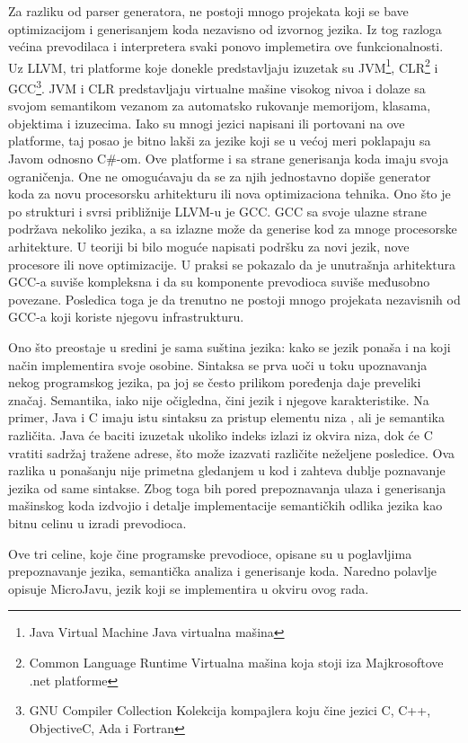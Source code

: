 Za razliku od parser generatora, ne postoji mnogo projekata koji se bave optimizacijom i generisanjem koda nezavisno od izvornog jezika.
Iz tog razloga većina prevodilaca i interpretera svaki ponovo implemetira ove funkcionalnosti. 
Uz LLVM, tri platforme koje donekle predstavljaju izuzetak su 
JVM\footnote{\skr \eng Java Virtual Machine \ndash Java virtualna mašina}, 
CLR\footnote{\skr \eng Common Language Runtime \ndash Virtualna mašina koja stoji iza Majkrosoftove .net platforme} 
i GCC\footnote{\skr \eng GNU Compiler Collection \ndash Kolekcija kompajlera koju čine jezici C, C++, ObjectiveC, Ada i Fortran}. 
JVM i CLR predstavljaju virtualne mašine visokog nivoa i dolaze sa svojom semantikom vezanom za automatsko rukovanje memorijom, klasama, objektima i izuzecima. 
Iako su mnogi jezici napisani ili portovani na ove platforme, taj posao je bitno lakši za jezike koji se u većoj meri poklapaju sa Javom odnosno C\#-om. 
Ove platforme i sa strane generisanja koda imaju svoja ograničenja.
One ne omogućavaju da se za njih jednostavno dopiše generator koda za novu procesorsku arhitekturu ili nova optimizaciona tehnika. 
Ono što je po strukturi i svrsi približnije LLVM-u je GCC.
GCC sa svoje ulazne strane podržava nekoliko jezika, a sa izlazne može da generise kod za mnoge procesorske arhitekture.
U teoriji bi bilo moguće napisati podršku za novi jezik, nove procesore ili nove optimizacije.
U praksi se pokazalo da je unutrašnja arhitektura GCC-a suviše kompleksna i da su komponente prevodioca suviše međusobno povezane. 
Posledica toga je da trenutno ne postoji mnogo projekata nezavisnih od GCC-a koji koriste njegovu infrastrukturu.

Ono što preostaje u sredini je sama suština jezika: kako se jezik ponaša i na koji način implementira svoje osobine.
Sintaksa se prva uoči u toku upoznavanja nekog programskog jezika, pa joj se često prilikom poređenja daje preveliki značaj.
Semantika, iako nije očigledna, čini jezik i njegove karakteristike.
Na primer, Java i C imaju istu sintaksu za pristup elementu niza \ndash {}, ali je semantika različita.
Java će baciti izuzetak ukoliko indeks izlazi iz okvira niza, dok će C vratiti sadržaj tražene adrese, što može izazvati različite neželjene posledice.
Ova razlika u ponašanju nije primetna gledanjem u kod i zahteva dublje poznavanje jezika od same sintakse.
Zbog toga bih pored prepoznavanja ulaza i generisanja mašinskog koda izdvojio i detalje implementacije semantičkih odlika jezika kao bitnu celinu u izradi prevodioca.

Ove tri celine, koje čine programske prevodioce, opisane su u poglavljima prepoznavanje jezika, semantička analiza i generisanje koda.
Naredno polavlje opisuje MicroJavu, jezik koji se implementira u okviru ovog rada.
